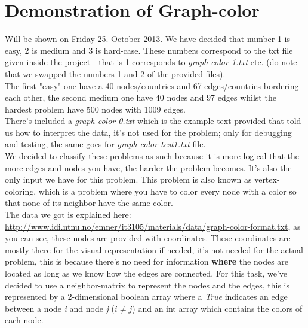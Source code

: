 \documentclass[12pt, a4paper]{article}
\begin{document}
\section{Demonstration of Graph-color}
Will be shown on Friday 25. October 2013.
We have decided that number 1 is easy, 2 is medium and 3 is hard-case.  These numbers correspond to the txt file given inside the project - that is 1 corresponds to \textit{graph-color-1.txt} etc. (do note that we swapped the numbers 1 and 2 of the provided files).\\
The first "easy" one have a 40 nodes/countries and 67 edges/countries bordering each other, the second medium one have 40 nodes and 97 edges whilst the hardest problem have 500 nodes with 1009 edges.\\
There's included a \textit{graph-color-0.txt} which is the example text provided that told us how to interpret the data, it's not used for the problem; only for debugging and testing, the same goes for \textit{graph-color-test1.txt} file.\\ 
We decided to classify these problems as such because it is more logical that the more edges and nodes you have, the harder the problem becomes. It's also the only input we have for this problem.
This problem is also known as vertex-coloring, which is a problem where you have to color every node with a color so that none of its neighbor have the same color.\\
The data we got is explained here:\\ \href{http://www.idi.ntnu.no/emner/it3105/materials/data/graph-color-format.txt}{http://www.idi.ntnu.no/emner/it3105/materials/data/graph-color-format.txt},
as you can see, these nodes are provided with coordinates. These coordinates are mostly there for the visual representation if needed, it's not needed for the actual problem, this is because there's no need for information \textbf{where} the nodes are located as long as we know how the edges are connected. For this task, we've decided to use a neighbor-matrix to represent the nodes and the edges, this is represented by a 2-dimensional boolean array where a \textit{True} indicates an edge between a node \textit{i} and node \textit{j} ($i \neq j$) and an int array which contains the colors of each node.
\end{document}
